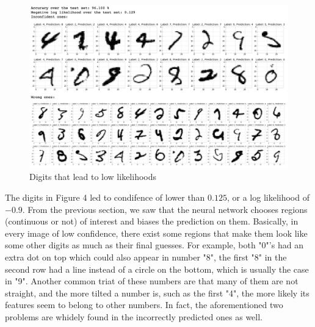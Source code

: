 \documentclass{article} %
\begin{document}
  \begin{figure}[!h]
    \centering
    \includegraphics[width=\linewidth]{A4_4.png}
    \caption{Digits that lead to low likelihoods}
    \label{fig:4}
  \end{figure}
  
  The digits in Figure 4 led to condifence of lower than $0.125$, or a log likelihood of $-0.9$. From the previous section, we saw that the neural network chooses regions (continuous or not) of interest and biases the prediction on them. Basically, in every image of low confidence, there exist some regions that make them look like some other digits as much as their final guesses. For example, both "0"'s had an extra dot on top which could also appear in number "8", the first "8" in the second row had a line instead of a circle on the bottom, which is usually the case in "9". Another common triat of these numbers are that many of them are not straight, and the more tilted a number is, such as the first "4", the more likely its features seem to belong to other numbers. In fact, the aforementioned two problems are whidely found in the incorrectly predicted ones as well.
\end{document}
